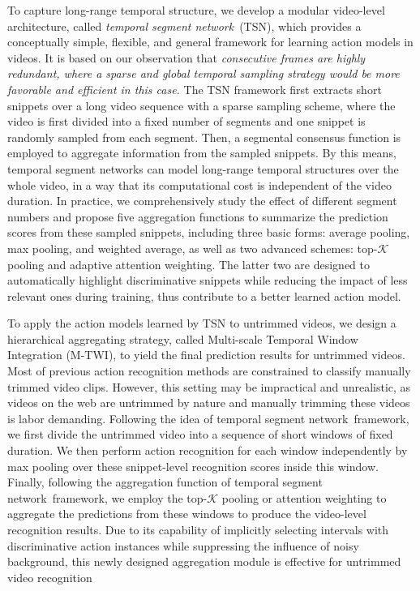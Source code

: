 \documentclass[10pt,journal,compsoc]{IEEEtran}
\newcommand{\SEGNET}{temporal segment network}
\begin{document}
To capture long-range temporal structure, we develop a modular video-level architecture, called \emph{\SEGNET}~(TSN), which provides a conceptually simple, flexible, and general framework for learning action models in videos. It is based on our observation that {\em consecutive frames are highly redundant, where a sparse and global temporal sampling strategy would be more favorable and efficient in this case.} The TSN framework first extracts short snippets over a long video sequence with a sparse sampling scheme, where the video is first divided into a fixed number of segments and one snippet is randomly sampled from each segment.
Then, a segmental consensus function is employed to aggregate information from the sampled snippets. By this means, \SEGNET s can model long-range temporal structures over the whole video, in a way that its computational cost is independent of the video duration. In practice, we comprehensively study the effect of different segment numbers and propose five aggregation functions to summarize the prediction scores from these sampled snippets, including three basic forms: average pooling, max pooling, and weighted average, as well as two advanced schemes: top-$\mathcal{K}$ pooling and adaptive attention weighting. The latter two are designed to automatically highlight discriminative snippets while reducing the impact of less relevant ones during training, thus contribute to a better learned action model.

To apply the action models learned by TSN to untrimmed videos, we design a hierarchical aggregating strategy, called Multi-scale Temporal Window Integration (M-TWI), to yield the final prediction results for untrimmed videos. Most of previous action recognition methods are constrained to classify manually trimmed video clips. However, this setting may be impractical and unrealistic, as videos on the web are untrimmed by nature and manually trimming these videos is labor demanding. Following the idea of \SEGNET~framework, we first divide the untrimmed video into a sequence of short windows of fixed duration. We then perform action recognition for each window independently by max pooling over these snippet-level recognition scores inside this window. Finally, following the aggregation function of \SEGNET~framework, we employ the top-$\mathcal{K}$ pooling or attention weighting to aggregate the predictions from these windows to produce the video-level recognition results.
Due to its capability of implicitly selecting intervals with discriminative action instances while suppressing the influence of noisy background, this newly designed aggregation module is effective for untrimmed video recognition
\end{document}
